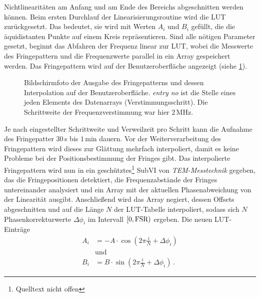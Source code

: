 Nichtlinearitäten am Anfang und am Ende des Bereichs abgeschnitten werden
können. Beim ersten Durchlauf der Linearisierungsroutine wird die LUT
zurückgesetzt. Das bedeutet, sie wird mit Werten $A_i$ und $B_i$ gefüllt, die
die äquidistanten Punkte auf einem Kreis repräsentieren. Sind alle nötigen
Parameter gesetzt, beginnt das Abfahren der Frequenz linear zur LUT, wobei die
Messwerte des Fringepattern und die Frequenzwerte parallel in ein Array
gespeichert werden. Das Fringepattern wird auf der
Benutzeroberfläche angezeigt (siehe
\ref{fig:linearisierung_benutzeroberflaeche_fringepattern}).\par
\begin{figure}[h]
 	\centering
	\caption[Benutzeroberfläche Linearisierung -
	Fringepattern]{Bildschirmfoto der Ausgabe des Fringepatterns und dessen
	Interpolation auf der Benutzeroberfläche. \textit{entry no} ist die Stelle
	eines jeden Elements des Datenarrays (Verstimmungsschritt). Die Schrittweite
	der Frequenzverstimmung war hier $2\,$MHz.}
	\label{fig:linearisierung_benutzeroberflaeche_fringepattern}
\end{figure}
Je nach eingestellter Schrittweite und Verweilzeit pro Schritt kann die
Aufnahme des Fringepatter $30\,$s bis $1\,$min dauern. Vor der
Weiterverarbeitung des Fringepattern wird dieses zur Glättung mehrfach interpoliert, damit es keine Probleme bei der Positionsbestimmung der Fringes
gibt. Das interpolierte Fringepattern wird nun in ein
geschütztes\footnote{Quelltext nicht offen} SubVI von \textit{TEM-Messtechnik} gegeben, das die Fringepositionen detektiert, die Frequenzabstände der Fringes
untereinander analysiert und ein Array mit der aktuellen Phasenabweichung von
der Linearität ausgibt. Anschließend wird das Array negiert, dessen Offsets
abgeschnitten und auf die Länge $N$ der LUT-Tabelle interpoliert, sodass sich
$N$ Phasenkorrekturwerte $\Delta\phi_i$ im Intervall
$[0,\text{\lstinline|FSR|})$ ergeben. Die neuen LUT-Einträge
\begin{equation}\label{eq:LUT_korrektur_01}
	\begin{split}
		A_i&=-A\cdot\cos{\left(2\pi\frac{i}{N}+\Delta\phi_i\right)}\\
		&\text{und}\\
		B_i&=B\cdot\sin{\left(2\pi\frac{i}{N}+\Delta\phi_i\right)}\,.
	\end{split}
\end{equation}

